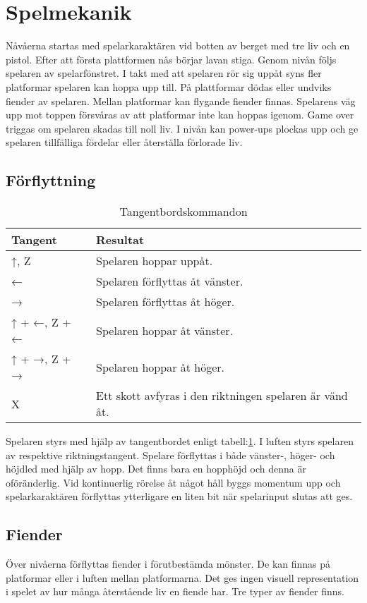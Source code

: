 \documentclass{TDP005mall}
\begin{document}
\section{Spelmekanik}%
Nåvåerna startas med spelarkaraktären vid botten av berget med tre liv och en pistol. Efter att första plattformen nås börjar lavan stiga. Genom nivån följs spelaren av spelarfönstret. I takt med att spelaren rör sig uppåt syns fler platformar spelaren kan hoppa upp till. På plattformar dödas eller undviks fiender av spelaren. Mellan platformar kan flygande fiender finnas. Spelarens väg upp mot toppen försvåras av att platformar inte kan hoppas igenom. Game over triggas om spelaren skadas till noll liv. I nivån kan power-ups plockas upp och ge spelaren tillfälliga fördelar eller återställa förlorade liv. 

\subsection{Förflyttning}

\begin{table}[h!]
  \centering
  \caption{Tangentbordskommandon\label{tab:1}}
\begin{tabular}{|l|l|}
\hline
Tangent & Resultat \\\hline
↑, Z & Spelaren hoppar uppåt. \\\hline
← & Spelaren förflyttas åt vänster. \\\hline
→ & Spelaren förflyttas åt höger. \\\hline
↑ + ←, Z + ← & Spelaren hoppar åt vänster. \\\hline
↑ + →, Z + → & Spelaren hoppar åt höger. \\\hline
X & Ett skott avfyras i den riktningen spelaren är vänd åt. \\\hline
\end{tabular}
\end{table}


Spelaren styrs med hjälp av tangentbordet enligt tabell:\ref{tab:1}. I luften styrs spelaren av respektive riktningstangent. Spelare förflyttas i både vänster-, höger- och höjdled med hjälp av hopp. Det finns bara en hopphöjd och denna är oföränderlig. Vid kontinuerlig rörelse åt något håll byggs momentum upp och spelarkaraktären förflyttas ytterligare en liten bit när spelarinput slutas att ges.

\subsection{Fiender}
Över nivåerna förflyttas fiender i förutbestämda mönster. De kan finnas på platformar eller i luften mellan platformarna. Det ges ingen visuell representation i spelet av hur många återstående liv en fiende har. Tre typer av fiender finns.
\end{document}
